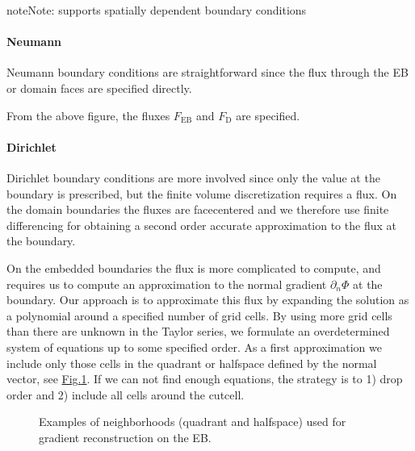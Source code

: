 \documentclass[letterpaper,10pt,english]{sphinxmanual}
\let\sphinxpxdimen\pdfpxdimen\else\newdimen\sphinxpxdimen
\begin{document}
\begin{sphinxadmonition}{note}{Note:}
 supports spatially dependent boundary conditions
\end{sphinxadmonition}


\paragraph{Neumann}
\label{\detokenize{Source/LinearSolvers:neumann}}
Neumann boundary conditions are straightforward since the flux through the EB or domain faces are specified directly.

From the above figure, the fluxes \(F_{\textrm{EB}}\) and \(F_{\textrm{D}}\) are specified.


\paragraph{Dirichlet}
\label{\detokenize{Source/LinearSolvers:dirichlet}}\label{\detokenize{Source/LinearSolvers:chap-linearsolverdirichletbc}}
Dirichlet boundary conditions are more involved since only the value at the boundary is prescribed, but the finite volume discretization requires a flux.
On the domain boundaries the fluxes are face\sphinxhyphen{}centered and we therefore use finite differencing for obtaining a second order accurate approximation to the flux at the boundary.

On the embedded boundaries the flux is more complicated to compute, and requires us to compute an approximation to the normal gradient \(\partial_n\Phi\) at the boundary.
Our approach is to approximate this flux by expanding the solution as a polynomial around a specified number of grid cells.
By using more grid cells than there are unknown in the Taylor series, we formulate an over\sphinxhyphen{}determined system of equations up to some specified order.
As a first approximation we include only those cells in the quadrant or half\sphinxhyphen{}space defined by the normal vector, see \hyperref[\detokenize{Source/LinearSolvers:fig-gradientreconstruction}]{Fig.\@ \ref{\detokenize{Source/LinearSolvers:fig-gradientreconstruction}}}.
If we can not find enough equations, the strategy is to 1) drop order and 2) include all cells around the cut\sphinxhyphen{}cell.

\begin{figure}[htb]
\centering
\capstart

\noindent\sphinxincludegraphics[width=360\sphinxpxdimen]{{GradientReconstruction}.png}
\caption{Examples of neighborhoods (quadrant and half\sphinxhyphen{}space) used for gradient reconstruction on the EB.}\label{\detokenize{Source/LinearSolvers:id2}}\label{\detokenize{Source/LinearSolvers:fig-gradientreconstruction}}\end{figure}
\end{document}

